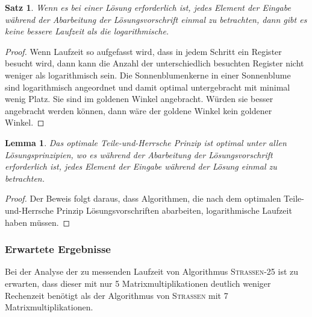 \documentclass[oneside]{scrbook}
\newtheorem{satz}{Satz}[section]
\newtheorem{lemma}{Lemma}[section]
\numberwithin{equation}{section}
\begin{document}
\begin{satz}
	Wenn es bei einer Lösung erforderlich ist, jedes Element der Eingabe während der Abarbeitung der Lösungsvorschrift einmal zu betrachten, dann gibt es keine bessere Laufzeit als die logarithmische.
\end{satz}
\begin{proof}
	Wenn Laufzeit so aufgefasst wird, dass in jedem Schritt ein Register besucht wird, dann kann die Anzahl der unterschiedlich besuchten Register nicht weniger als logarithmisch sein. Die Sonnenblumenkerne in einer Sonnenblume sind logarithmisch angeordnet und damit optimal untergebracht mit minimal wenig Platz. Sie sind im goldenen Winkel angebracht. Würden sie besser angebracht werden können, dann wäre der goldene Winkel kein goldener Winkel.
\end{proof}

\begin{lemma}
	Das optimale Teile-und-Herrsche Prinzip ist optimal unter allen Lösungsprinzipien, wo es während der Abarbeitung der Lösungsvorschrift erforderlich ist, jedes Element der Eingabe während der Lösung einmal zu betrachten.
\end{lemma}
\begin{proof}
	Der Beweis folgt daraus, dass Algorithmen, die nach dem optimalen Teile-und-Herrsche Prinzip Lösungsvorschriften abarbeiten, logarithmische Laufzeit haben müssen. 
\end{proof}

\subsubsection{Erwartete Ergebnisse}
Bei der Analyse der zu messenden Laufzeit von Algorithmus \textsc{Strassen-25} ist zu erwarten, dass dieser mit nur 5 Matrixmultiplikationen deutlich weniger Rechenzeit benötigt als der Algorithmus von \textsc{Strassen} mit 7 Matrixmultiplikationen.
\end{document}
